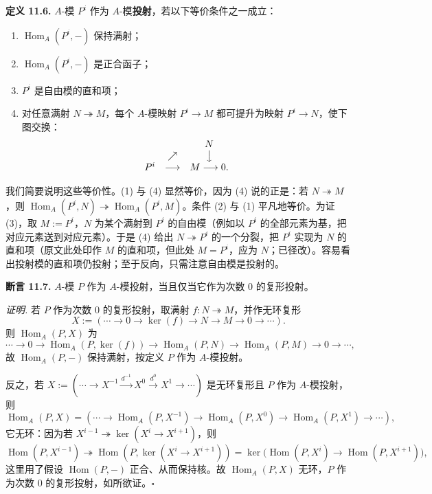 \textbf{定义 11.6.} $A$-模 $P^i$ 作为 $A$-模\textbf{投射}，若以下等价条件之一成立：
\begin{enumerate}[label=(\arabic*),leftmargin=2.4em]
\item $\operatorname{Hom}_A(P^i,-)$ 保持满射；
\item $\operatorname{Hom}_A(P^i,-)$ 是正合函子；
\item $P^i$ 是自由模的直和项；
\item 对任意满射 $N\twoheadrightarrow M$，每个 $A$-模映射 $P^i\to M$ 都可提升为映射 $P^i\to N$，使下图交换：
\[
\begin{array}{ccc}
& & N\\
& \nearrow & \big\downarrow\\
P^i & \longrightarrow & M\longrightarrow0.
\end{array}
\]
\end{enumerate}

我们简要说明这些等价性。(1) 与 (4) 显然等价，因为 (4) 说的正是：若 $N\twoheadrightarrow M$，则 $\operatorname{Hom}_A(P^i,N)\twoheadrightarrow\operatorname{Hom}_A(P^i,M)$。条件 (2) 与 (1) 平凡地等价。为证 (3)，取 $M:=P^i$，$N$ 为某个满射到 $P^i$ 的自由模（例如以 $P^i$ 的全部元素为基，把对应元素送到对应元素）。于是 (4) 给出 $N\twoheadrightarrow P^i$ 的一个分裂，把 $P^i$ 实现为 $N$ 的直和项（原文此处印作 $M$ 的直和项，但此处 $M=P^i$，应为 $N$；已径改）。容易看出投射模的直和项仍投射；至于反向，只需注意自由模是投射的。

\textbf{断言 11.7.} $A$-模 $P$ 作为 $A$-模投射，当且仅当它作为次数 $0$ 的复形投射。

\textit{证明.} 若 $P$ 作为次数 $0$ 的复形投射，取满射 $f\colon N\twoheadrightarrow M$，并作无环复形
\[
X:=(\cdots\to0\to\ker(f)\to N\to M\to0\to\cdots).
\]
则 $\operatorname{Hom}_A(P,X)$ 为
\[
\cdots\to0\to\operatorname{Hom}_A(P,\ker(f))\to\operatorname{Hom}_A(P,N)\to\operatorname{Hom}_A(P,M)\to0\to\cdots,
\]
故 $\operatorname{Hom}_A(P,-)$ 保持满射，按定义 $P$ 作为 $A$-模投射。

反之，若 $X:=(\cdots\to X^{-1}\xrightarrow{d^{-1}}X^0\xrightarrow{d^0}X^1\to\cdots)$ 是无环复形且 $P$ 作为 $A$-模投射，则
\[
\operatorname{Hom}_A(P,X)=(\cdots\to\operatorname{Hom}_A(P,X^{-1})\to\operatorname{Hom}_A(P,X^0)\to\operatorname{Hom}_A(P,X^1)\to\cdots),
\]
它无环：因为若 $X^{i-1}\twoheadrightarrow\ker(X^i\to X^{i+1})$，则
\[
\operatorname{Hom}(P,X^{i-1})\twoheadrightarrow\operatorname{Hom}(P,\ker(X^i\to X^{i+1}))=\ker\bigl(\operatorname{Hom}(P,X^i)\to\operatorname{Hom}(P,X^{i+1})\bigr),
\]
这里用了假设 $\operatorname{Hom}(P,-)$ 正合、从而保持核。故 $\operatorname{Hom}_A(P,X)$ 无环，$P$ 作为次数 $0$ 的复形投射，如所欲证。\hfill$\square$

